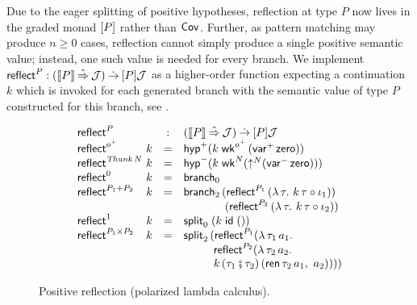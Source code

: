 \documentclass[sigconf,screen,fleqn]{acmart} %
\begin{document}
Due to the eager splitting of positive hypotheses, reflection at type $P$
now lives in the graded monad $[P]$ rather than $\mathsf{Cov}^{}$.  Further,
as pattern matching may produce $n \geq 0$ cases, reflection cannot simply
produce a single positive semantic value; instead, one such value is needed
for every branch.  We implement
$\reflect P : (\den P \hatto \J) \todot \Add P \J$
as a higher-order function expecting a continuation $k$ which is
invoked for each generated branch with the semantic value of type $P$
constructed for this branch, see .
\begin{figure}[htbp]
\hrulefill
\[
\renewcommand{\left}{}
\renewcommand{\right}{}
\begin{array}{l@{~}lcl}
  \multicolumn 2 l {\reflect P} & : & (\den P \hatto \J) \todot \Add P \J \\
  \reflect {\patom} & k & = &
    \phyp \left( k\;\twk^{\patom}\,(\pvar\,\tzero) \right) \\
  \reflect {\Thunk N} & k & = &
    \nhyp \left( k\;\twk^N \left( \up N (\nvar\,\tzero) \right) \right)\\
  \reflect {\tyzero} & k & = & \nbranch \\
  \reflect {P_1 + P_2} & k & = & \bbranch
    \,\left( \treflect^{P_1}\,(\lambda\,\tau. \ k\,\tau \comp \iota_1) \right)
\\ &&& \qquad \quad \ \,
    \,\left( \treflect^{P_2}\,(\lambda\,\tau. \ k\,\tau \comp \iota_2) \right)
    \\
  \reflect{\tyone} & k & = & \nsplit\;(k\;\tid\;\ttempty) \\
  \reflect{P_1 \times P_2} & k & = & \bsplit
    \,\left(
      \treflect^{P_1} \left( \lambda\,\tau_1\,a_1. \
\\ &&& \qquad \ \
      \treflect^{P_2} \left( \lambda\,\tau_2\,a_2. \
\\ &&& \qquad \ \
        k\, (\tau_1 \rcomp \tau_2)\, (\tren\,\tau_2\,a_1, \ a_2)
        \right)
      \right)
    \right)
\end{array}
\]
\hrulefill
  \caption{Positive reflection (polarized lambda calculus).}
  \label{fig:posrefl}
\end{figure}
\end{document}
